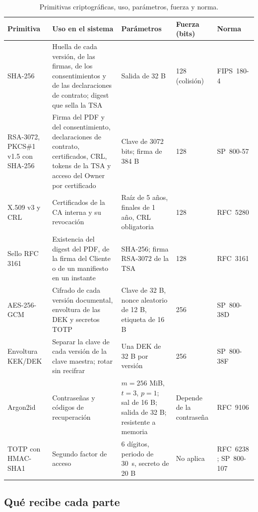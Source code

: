 \begin{table}[!htbp]
  \centering
  \caption{Primitivas criptográficas, uso, parámetros, fuerza y norma.}
  \label{tab:cripto-primitivas}
  
  \begin{tabularx}{\linewidth}{@{}L{2.8cm} X L{3.3cm} L{1.75cm} L{2.3cm}@{}}
    \toprule
    \textbf{Primitiva} & \textbf{Uso en el sistema} & \textbf{Parámetros} & \textbf{Fuerza (bits)} & \textbf{Norma} \\
    \midrule
    SHA-256 & Huella de cada versión, de las firmas, de los consentimientos y de las declaraciones de contrato; digest que sella la TSA & Salida de 32 B & 128 (colisión) & FIPS~180-4 \cite{nist2015fips1804} \\
    RSA-3072, PKCS\#1 v1.5 con SHA-256 & Firma del PDF y del consentimiento, declaraciones de contrato, certificados, CRL, tokens de la TSA y acceso del Owner por certificado & Clave de 3072 bits; firma de 384 B & 128 & SP~800-57 \cite{barker2020} \\
    X.509 v3 y CRL & Certificados de la CA interna y su revocación & Raíz de 5 años, finales de 1 año, CRL obligatoria & 128 & RFC~5280 \cite{cooper2008} \\
    Sello RFC 3161 & Existencia del digest del PDF, de la firma del Cliente o de un manifiesto en un instante & SHA-256; firma RSA-3072 de la TSA & 128 & RFC~3161 \cite{adams2001} \\
    AES-256-GCM & Cifrado de cada versión documental, envoltura de las DEK y secretos TOTP & Clave de 32 B, nonce aleatorio de 12 B, etiqueta de 16 B & 256 & SP~800-38D \cite{dworkin2007} \\
    Envoltura KEK/DEK & Separar la clave de cada versión de la clave maestra; rotar sin recifrar & Una DEK de 32 B por versión & 256 & SP~800-38F \cite{dworkin2012} \\
    Argon2id & Contraseñas y códigos de recuperación & $m = 256$ MiB, $t = 3$, $p = 1$; sal de 16 B; salida de 32 B; resistente a memoria & Depende de la contraseña & RFC~9106 \cite{biryukov2021} \\
    TOTP con HMAC-SHA1 & Segundo factor de acceso & 6 dígitos, periodo de 30~s, secreto de 20 B & No aplica & RFC~6238 \cite{mraihi2011}; SP~800-107 \cite{dang2012} \\
    \bottomrule
  \end{tabularx}
\end{table}

\subsection{Qué recibe cada parte}\label{sec:cripto-fronteras}

